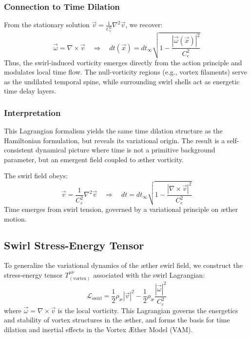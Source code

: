 \subsubsection*{Connection to Time Dilation}

From the stationary solution \( \vec{v} = \frac{1}{C_e^2} \nabla^2 \vec{v} \), we recover:
\begin{equation}
    \vec{\omega} = \nabla \times \vec{v} \quad \Rightarrow \quad
    dt(\vec{x}) = dt_\infty \sqrt{1 - \frac{|\vec{\omega}(\vec{x})|^2}{C_e^2}}
\end{equation}
Thus, the swirl-induced vorticity emerges directly from the action principle and modulates local time flow. The null-vorticity regions (e.g., vortex filaments) serve as the undilated temporal spine, while surrounding swirl shells act as energetic time delay layers.

\subsubsection*{Interpretation}

This Lagrangian formalism yields the same time dilation structure as the Hamiltonian formulation, but reveals its variational origin. The result is a self-consistent dynamical picture where time is not a primitive background parameter, but an emergent field coupled to æther vorticity.

\begin{tcolorbox}[colback=blue!1, colframe=blue!60, title=Euler–Lagrange Summary]
    The swirl field obeys:
    \[
        \vec{v} = \frac{1}{C_e^2} \nabla^2 \vec{v}
        \quad \Longrightarrow \quad
        dt = dt_\infty \sqrt{1 - \frac{|\nabla \times \vec{v}|^2}{C_e^2}}
    \]
    Time emerges from swirl tension, governed by a variational principle on æther motion.
\end{tcolorbox}



\subsection{Swirl Stress-Energy Tensor}
\label{sec:swirl_stress_tensor}

To generalize the variational dynamics of the æther swirl field, we construct the stress-energy tensor \( T^{\mu\nu}_{(\text{vortex})} \) associated with the swirl Lagrangian:
\begin{equation}
    \mathcal{L}_{\text{swirl}} = \frac{1}{2} \rho_\text{\ae} |\vec{v}|^2 - \frac{1}{2} \rho_\text{\ae} \frac{|\vec{\omega}|^2}{C_e^2}
\end{equation}
where \( \vec{\omega} = \nabla \times \vec{v} \) is the local vorticity. This Lagrangian governs the energetics and stability of vortex structures in the æther, and forms the basis for time dilation and inertial effects in the Vortex \AE ther Model (VAM).


